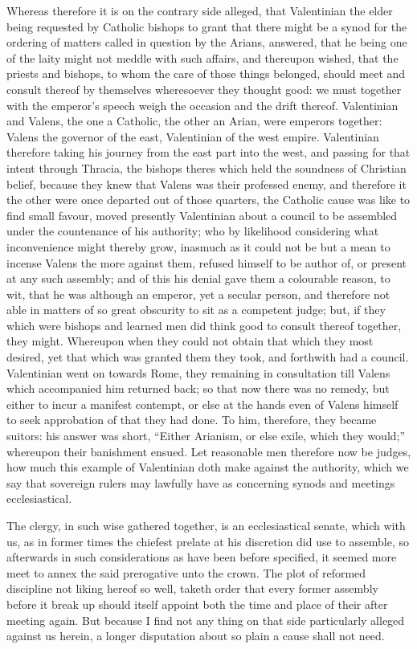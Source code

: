 Whereas therefore it is on the contrary side alleged, that Valentinian the elder being requested by Catholic bishops to grant that there might be a synod for the ordering of matters called in question by the Arians, answered, that he being one of the laity might not meddle with such affairs, and thereupon wished, that the priests and bishops, to whom the care of those things belonged, should meet and consult thereof by themselves wheresoever they thought good: we must together with the emperor’s speech weigh the occasion and the drift thereof. Valentinian and Valens, the one a Catholic, the other an Arian, were emperors together: Valens the governor of the east, Valentinian of the west empire. Valentinian therefore taking his journey from the east part into the west, and passing for that intent through Thracia, the bishops theres which held the soundness of Christian belief, because they knew that Valens was their professed enemy, and therefore it the other were once departed out of those quarters, the Catholic cause was like to find small favour, moved presently Valentinian about a council to be  assembled under the countenance of his authority; who by likelihood considering what inconvenience might thereby grow, inasmuch as it could not be but a mean to incense Valens the more against them, refused himself to be author of, or present at any such assembly; and of this his denial gave them a colourable reason, to wit, that he was although an emperor, yet a secular person, and therefore not able in matters of so great obscurity to sit as a competent judge; but, if they which were bishops and learned men did think good to consult thereof together, they might. Whereupon when they could not obtain that which they most desired, yet that which was granted them they took, and forthwith had a council. Valentinian went on towards Rome, they remaining in consultation till Valens which accompanied him returned back; so that now there was no remedy, but either to incur a manifest contempt, or else at the hands even of Valens himself to seek approbation of that they had done. To him, therefore, they became suitors: his answer was short, “Either Arianism, or else exile, which they would;” whereupon their banishment ensued. Let reasonable men therefore now be judges, how much this example of Valentinian doth make against the authority, which we say that sovereign rulers may lawfully have as concerning synods and meetings ecclesiastical.

The clergy, in such wise gathered together, is an ecclesiastical senate, which with us, as in former times the chiefest prelate at his discretion did use to assemble, so afterwards in such considerations as have been before specified, it seemed more meet to annex the said prerogative unto the crown. The plot of reformed discipline not liking hereof so well, taketh order that every former assembly before it break up should itself appoint both the time and place of their after meeting again. But because I find not any thing on that side particularly alleged against us herein, a longer disputation about so plain a cause shall not need.


